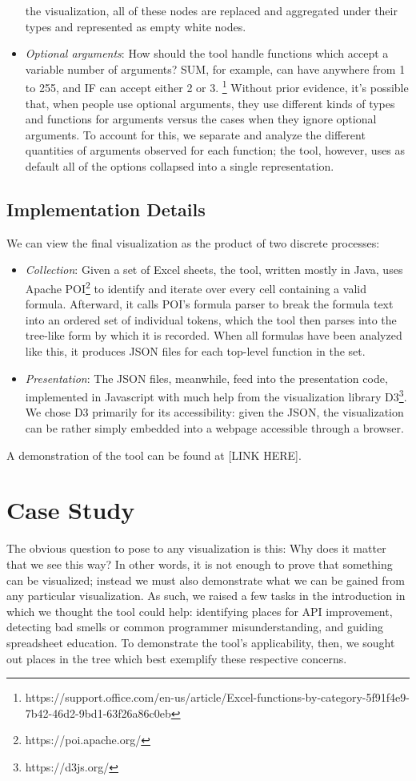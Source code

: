 \documentclass[conference]{IEEEtran}
\begin{document}
\begin{itemize}
		the visualization, all of these nodes are replaced and aggregated under their
		types and represented as empty white nodes. \item \textit{Optional arguments}:
		How should the tool handle functions which accept a variable number of
		arguments? SUM, for example, can have anywhere from 1 to 255, and IF can accept
		either 2 or 3.
		\footnote{https://support.office.com/en-us/article/Excel-functions-by-category-5f91f4e9-7b42-46d2-9bd1-63f26a86c0eb} Without prior evidence, it's possible that, when people use optional arguments, they use different kinds of types and functions for arguments versus the cases when they ignore optional arguments. To account for this, we separate and analyze the different quantities of arguments observed for each function; the tool, however, uses as default all of the options collapsed into a single representation. \end{itemize}
	
	\subsection{Implementation Details} We can view the final visualization as the
	product of two discrete processes: \begin{itemize} \item \textit{Collection}:
		Given a set of Excel sheets, the tool, written mostly in Java, uses Apache
		POI\footnote{https://poi.apache.org/} to identify and iterate over every cell
		containing a valid formula. Afterward, it calls POI's formula parser to break
		the formula text into an ordered set of individual tokens, which the tool then
		parses into the tree-like form by which it is recorded. When all formulas have
		been analyzed like this, it produces JSON files for each top-level function in
		the set. \item \textit{Presentation}: The JSON files, meanwhile, feed into the
		presentation code, implemented in Javascript with much help from the
		visualization library D3\footnote{https://d3js.org/}. We chose D3 primarily for
		its accessibility: given the JSON, the visualization can be rather simply
		embedded into a webpage accessible through a browser. \end{itemize} A
	demonstration of the tool can be found at [LINK HERE].
	
	\section{Case Study} The obvious question to pose to any visualization is this:
	Why does it matter that we see this way? In other words, it is not enough to
	prove that something can be visualized; instead we must also demonstrate what
	we can be gained from any particular visualization. As such, we raised a few
	tasks in the introduction in which we thought the tool could help: identifying
	places for API improvement, detecting bad smells or common programmer
	misunderstanding, and guiding spreadsheet education. To demonstrate the tool's
	applicability, then, we sought out places in the tree which best exemplify
	these respective concerns.
	
\end{document}
